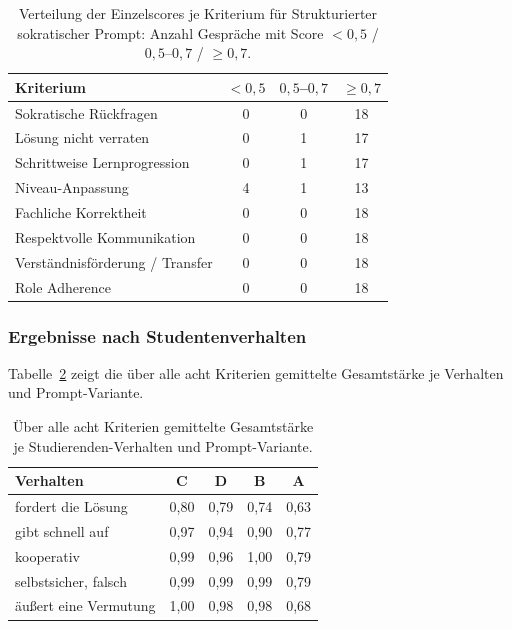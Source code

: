 \begin{table}[htbp]
  \centering
  \small
  \caption{Verteilung der Einzelscores je Kriterium für Strukturierter sokratischer Prompt: Anzahl Gespräche mit Score $<0{,}5$ / $0{,}5$--$0{,}7$ / $\ge 0{,}7$.}
  \label{tab:sp-bands}
  \begin{tabular}{lccc}
    \toprule
    \textbf{Kriterium} & \textbf{$<0{,}5$} & \textbf{$0{,}5$--$0{,}7$} & \textbf{$\ge 0{,}7$}\\
    \midrule
    Sokratische Rückfragen          & 0 & 0 & 18\\
    Lösung nicht verraten           & 0 & 1 & 17\\
    Schrittweise Lernprogression    & 0 & 1 & 17\\
    Niveau-Anpassung                & 4 & 1 & 13\\
    Fachliche Korrektheit           & 0 & 0 & 18\\
    Respektvolle Kommunikation      & 0 & 0 & 18\\
    Verständnisförderung / Transfer & 0 & 0 & 18\\
    Role Adherence                  & 0 & 0 & 18\\
    \bottomrule
  \end{tabular}
\end{table}

\subsubsection{Ergebnisse nach Studentenverhalten}

Tabelle~\ref{tab:beh-variante} zeigt die über alle acht Kriterien gemittelte Gesamtstärke je
Verhalten und Prompt-Variante.

\begin{table}[htbp]
  \centering
  \small
  \caption{Über alle acht Kriterien gemittelte Gesamtstärke je Studierenden-Verhalten und Prompt-Variante.}
  \label{tab:beh-variante}
  \begin{tabular}{lcccc}
    \toprule
    \textbf{Verhalten} & \textbf{C} & \textbf{D} & \textbf{B} & \textbf{A}\\
    \midrule
    fordert die Lösung    & 0,80 & 0,79 & 0,74 & 0,63\\
    gibt schnell auf      & 0,97 & 0,94 & 0,90 & 0,77\\
    kooperativ            & 0,99 & 0,96 & 1,00 & 0,79\\
    selbstsicher, falsch  & 0,99 & 0,99 & 0,99 & 0,79\\
    äußert eine Vermutung & 1,00 & 0,98 & 0,98 & 0,68\\
    \bottomrule
  \end{tabular}
\end{table}

